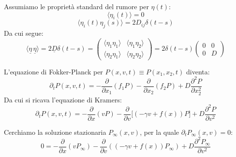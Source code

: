Assumiamo le proprietà standard del rumore per $\eta(t)$:
\begin{equation} \langle \eta_i(t) \rangle = 0 \end{equation}
\begin{equation}
\langle \eta_i(t)\eta_j(s) \rangle = 2D_{ij}\delta(t-s)
\end{equation}
Da cui segue:
\begin{equation}
\langle \underline{\eta} \, \underline{\eta} \rangle = 2 \underline{D} \delta(t-s) = \begin{pmatrix} \langle \eta_1\eta_1 \rangle & \langle \eta_1\eta_2 \rangle \\ \langle \eta_2\eta_1 \rangle & \langle \eta_2\eta_2 \rangle \end{pmatrix} = 2 \delta(t-s) \begin{pmatrix} 0 & 0 \\ 0 & D \end{pmatrix}
\end{equation}

L'equazione di Fokker-Planck per $P(x,v,t) \equiv P(x_1,x_2,t)$ diventa:
\begin{equation}
\partial_t P(x,v,t) = -\frac{\partial}{\partial x_1}(f_1 P) - \frac{\partial}{\partial x_2}(f_2P) + D \frac{\partial^2 P}{\partial x_2^2}
\end{equation}
Da cui si ricava l'equazione di Kramers:
\begin{equation}
\partial_t P(x,v,t) = -\frac{\partial}{\partial x}(v P) - \frac{\partial}{\partial v} \bigl[(-\gamma v + f(x))P\bigr] + D \frac{\partial^2 P}{\partial v^2}
\label{eq:kramers_p_t}
\end{equation}

Cerchiamo la soluzione stazionaria $P_{\infty}(x,v)$, per la quale $\partial_t P_{\infty}(x,v) = 0$:
\begin{equation}
0 = -\frac{\partial}{\partial x}(v P_{\infty}) - \frac{\partial}{\partial v}((-\gamma v + f(x))P_{\infty}) + D \frac{\partial^2 P_{\infty}}{\partial v^2}
\label{eq:kramers_stazionaria}
\end{equation}

